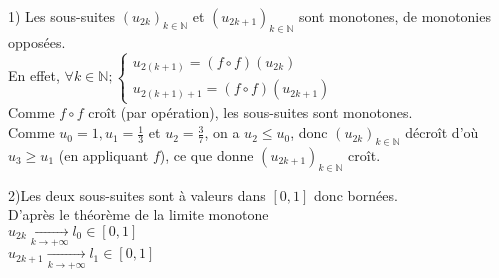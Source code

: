 \documentclass[10pt,a4paper]{article}
\theoremstyle{definition}
\begin{document}
1) Les sous-suites $(u_{2k})_{k \in \mathbb{N}}$ et $(u_{2k + 1})_{k \in \mathbb{N}}$ sont monotones, de monotonies opposées. \\
En effet, $\forall k \in \mathbb{N}; \begin{cases}
u_{2(k + 1)} = (f \circ f)(u_{2k}) \\ u_{2(k + 1) + 1} = (f \circ f)(u_{2k + 1})
\end{cases}$ \\
Comme $f \circ f$ croît (par opération), les sous-suites sont monotones. \\
Comme $u_0 = 1, u_1 = \frac{1}{3}$ et $u_2 = \frac{3}{7}$, on a $u_2 \leq u_0$, donc $(u_{2k})_{k \in \mathbb{N}}$ décroît d'où $u_3 \geq u_1$ (en appliquant $f$), ce que donne $(u_{2k + 1})_{k \in \mathbb{N}}$ croît.\medskip

2)Les deux sous-suites sont à valeurs dans $[0, 1]$ donc bornées. \\
D'après le théorème de la limite monotone \\
$u_{2k} \xrightarrow[k \to +\infty]{} l_0 \in [0, 1]$ \\
$u_{2k + 1} \xrightarrow[k \to +\infty]{} l_1 \in [0, 1]$ \medskip
\end{document}
